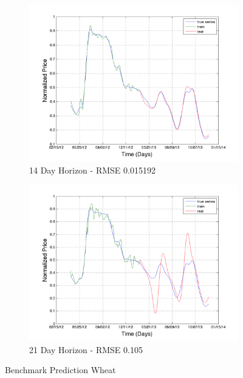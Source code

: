 \begin{figure}
       \hfill
       
        \begin{subfigure}[b]{0.5\textwidth}
                \includegraphics[width=\textwidth]{img/model/wheat/model1/pred_14}
                \caption{14 Day Horizon - RMSE 0.015192}
                \label{fig:mouse}
        \end{subfigure}%
         \begin{subfigure}[b]{0.5\textwidth}
                \includegraphics[width=\textwidth]{img/model/wheat/model1/pred_21}
                \caption{21 Day Horizon - RMSE  0.105}
                \label{fig:long_wheat_price}
        \end{subfigure}
        \caption{Benchmark Prediction Wheat}
        \label{fig:wheat_1}
               
\end{figure}





